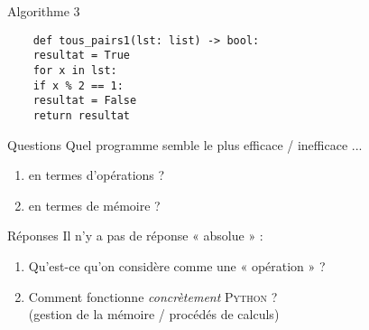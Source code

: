 \documentclass[12pt]{beamer}
\begin{document}
\begin{frame}[fragile]{Algorithme 3}
    
\begin{verbatim}
    def tous_pairs1(lst: list) -> bool:
    resultat = True
    for x in lst:
    if x % 2 == 1:
    resultat = False
    return resultat
\end{verbatim}
    
\end{frame}

\begin{frame}{Questions}
Quel programme semble le plus efficace / inefficace ...\\\pause
\begin{enumerate}[--]
	\item 	en termes d'opérations ?\pause
	\item 	en termes de mémoire ? 	
\end{enumerate}
\end{frame}

\begin{frame}{Réponses}
Il n'y a pas de réponse « absolue » :\pause

\begin{enumerate}[--]
	\item 	Qu'est-ce qu'on considère comme une « opération » ?\pause
	\item 	Comment fonctionne \textit{concrètement} \textsc{Python} ?\\\pause
            (gestion de la mémoire / procédés de calculs)
\end{enumerate}
\end{frame}
\end{document}
